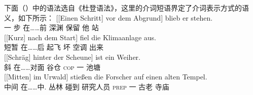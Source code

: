 下面（）中的语法选自《杜登语法》\citep[\S 1300]{Duden2005-Authors}，这里的介词短语界定了介词表示方式的语义，如下所示：
\eal
\ex\label{Beispiel-Schritt-vor-dem-Abgrund} 
\gll {}[[Einen Schritt] vor dem Abgrund] blieb er stehen.\\
	 {}\spacebr{}\spacebr{}一 步 在……前  深渊 保留 他 站\\
\ex 
\gll {}[[Kurz] nach dem Start] fiel die Klimaanlage aus.\\
	 {}\spacebr{}\spacebr{}短暂 在……后  起飞 坏  空调 出来\\
\ex 
\gll {}[[Schräg] hinter der Scheune] ist ein Weiher.\\
	 {}\spacebr{}\spacebr{}斜 在……对面  谷仓 \textsc{cop} 一 池塘\\
\ex 
\gll {}[[Mitten] im Urwald] stießen die Forscher auf einen alten Tempel.\\
	 {}\spacebr{}\spacebr{}中间 在……中. 丛林 碰到  研究人员 \textsc{prep} 一 古老 寺庙\\
\zl
